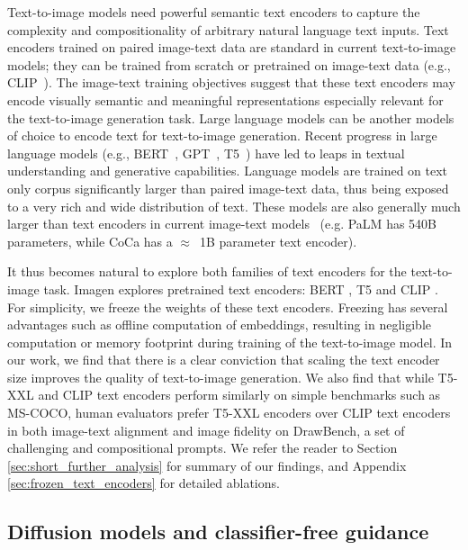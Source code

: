 Text-to-image models need powerful semantic text encoders to capture the complexity and compositionality of arbitrary natural language text inputs. Text encoders trained on paired image-text data are standard in current text-to-image models; they can be trained from scratch \cite{nichol-glide, ramesh-dalle} or pretrained on image-text data \cite{ramesh-dalle2} (e.g., CLIP~\cite{radford-icml-2021}). The image-text training objectives suggest that these text encoders may encode visually semantic and meaningful representations especially relevant for the text-to-image generation task. Large language models can be another models of choice to encode text for text-to-image generation. Recent progress in large language models (e.g., BERT~\cite{devlin-naacl-2019}, GPT~\cite{radford-gpt,radford-gpt2,brown-neurips-2020}, T5~\cite{raffel-jmlr-2020}) have led to leaps in textual understanding and generative capabilities. Language models are trained on text only corpus significantly larger than paired image-text data, thus being exposed to a very rich and wide distribution of text. These models are also generally much larger than text encoders in current image-text models~\cite{radford-icml-2021,jia2021scaling,yu2022coca} (e.g. PaLM \cite{palm-2022} has 540B parameters, while CoCa \cite{yu2022coca} has a $\approx$~1B parameter text encoder).

It thus becomes natural to explore both families of text encoders for the text-to-image task. Imagen explores pretrained text encoders: BERT \cite{devlin-naacl-2019}, T5 \cite{raffel-icml-2017} and CLIP \cite{radford-arxiv-2017}. For simplicity, we freeze the weights of these text encoders. Freezing has several advantages such as offline computation of embeddings, resulting in negligible computation or memory footprint during training of the text-to-image model. In our work, we find that there is a clear conviction that scaling the text encoder size improves the quality of text-to-image generation. We also find that while T5-XXL and CLIP text encoders perform similarly on simple benchmarks such as MS-COCO, human evaluators prefer T5-XXL encoders over CLIP text encoders in both image-text alignment and image fidelity on DrawBench, a set of challenging and compositional prompts. We refer the reader to Section \ref{sec:short_further_analysis} for summary of our findings, and Appendix \ref{sec:frozen_text_encoders} for detailed ablations.

\subsection{Diffusion models and classifier-free guidance}

